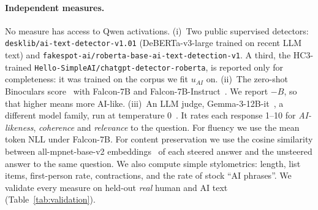 \paragraph{Independent measures.} No measure has access to Qwen activations.
(i)~Two public supervised detectors: \texttt{desklib/ai-text-detector-v1.01} (DeBERTa-v3-large trained on recent LLM text) and \texttt{fakespot-ai/roberta-base-ai-text-detection-v1}. A third, the HC3-trained \texttt{Hello-SimpleAI/chatgpt-detector-roberta}, is reported only for completeness: it was trained on the corpus we fit $u_{AI}$ on.
(ii)~The zero-shot Binoculars score~\citep{hans2024binoculars} with Falcon-7B and Falcon-7B-Instruct~\citep{almazrouei2023falcon}. We report $-B$, so that higher means more AI-like.
(iii)~An LLM judge, Gemma-3-12B-it~\citep{gemma2025gemma3}, a different model family, run at temperature 0~\citep{zheng2023judging}. It rates each response 1--10 for \emph{AI-likeness}, \emph{coherence} and \emph{relevance} to the question.
For fluency we use the mean token NLL under Falcon-7B. For content preservation we use the cosine similarity between all-mpnet-base-v2 embeddings~\citep{reimers2019sentence,song2020mpnet} of each steered answer and the unsteered answer to the same question. We also compute simple stylometrics: length, list items, first-person rate, contractions, and the rate of stock ``AI phrases''. We validate every measure on held-out \emph{real} human and AI text (Table~\ref{tab:validation}).
